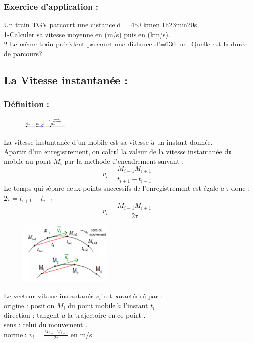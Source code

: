 \documentclass[12pt]{article}
\begin{document}
\subsubsection{Exercice d'application : }
Un train TGV parcourt une distance d = 450 kmen 1h23min20s.\\
1-Calculer sa vitesse moyenne en (m/s) puis en (km/s).\\
2-Le même train précédent parcourt une distance d'=630 km .Quelle est la durée de parcours? 

\subsection{La Vitesse instantanée : }
\subsubsection{Définition : }
\begin{figure}
    \includegraphics[width=0.2\textwidth]{./img/img05.png}
\end{figure}

La vitesse instantanée d'un mobile est sa vitesse $\grave{a}$ un instant donnée.
\\Apartir  d'un enregistrement, on calcul la valeur de la vitesse instantanée du mobile au point $M_i$ par la méthode d'encadrement suivant : $$v_i = \frac{M_{i-1}M_{i+1}}{t_{i+1}-t_{i-1}}$$
Le temps qui sépare deux points successifs de l'enregistrement est égale $\grave{a}\; \tau $ donc :$ 2\tau = t_{i+1}-t_{i-1}$ 
$$v_i = \frac{M_{i-1}M_{i+1}}{2\tau}$$

\begin{figure}
    \includegraphics[width=0.4\textwidth]{./img/img07.png}
\end{figure}

\underline{Le vecteur vitesse instantanée $\vec{v_i}$  est caractérisé par :}\\
origine : position $M_i$ du point mobile $\grave{a}$ l'instant $t_i$.\\
direction : tangent $\grave{a}$ la trajectoire en ce point . \\
sens  : celui du mouvement .\\
norme : $v_i = \frac{M_{i-1}M_{i+1}}{2\tau}$ en m/s
\end{document}

